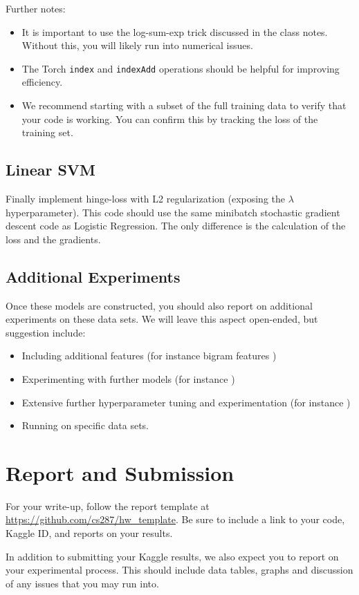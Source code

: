 \documentclass[11pt]{article}
\begin{document}
Further notes:

\begin{itemize}
\item It is important to use the log-sum-exp trick discussed in the
  class notes. Without this, you will likely run into numerical
  issues.

\item The Torch \texttt{index} and \texttt{indexAdd} operations should 
  be helpful for improving efficiency.

\item We recommend starting with a subset of the full training data to
  verify that your code is working. You can confirm this by tracking
  the loss of the training set.
\end{itemize}

\subsection{Linear SVM}

Finally implement hinge-loss with L2 regularization (exposing the $\lambda$
hyperparameter). This code should use the same minibatch stochastic
gradient descent code as Logistic Regression. The only difference is
the calculation of the loss and the gradients. 

\subsection{Additional Experiments}

Once these models are constructed, you should also report on
additional experiments on these data sets. We will leave this aspect
open-ended, but suggestion include:

\begin{itemize}
\item Including additional features (for instance bigram features \cite{})
\item Experimenting with further models (for instance \cite{})
\item Extensive further hyperparameter tuning and experimentation (for instance \cite{})
\item Running on specific data sets. 
\end{itemize}

\section{Report and Submission}

For your write-up, follow the report template at
\url{https://github.com/cs287/hw_template}. Be sure to include a link
to your code, Kaggle ID, and reports on your results.

In addition to submitting your Kaggle results, we also expect you to report on your 
experimental process. This should include data tables, graphs and discussion of any 
issues that you may run into. 
\end{document}
